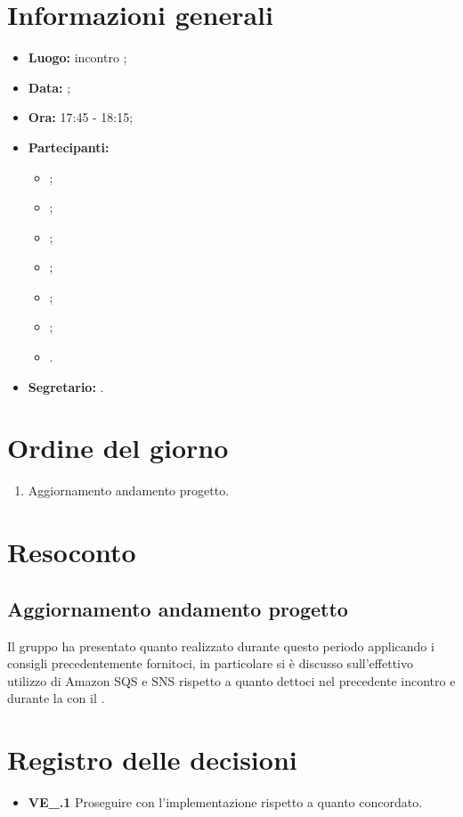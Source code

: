 \section{Informazioni generali}
\begin{itemize}
\item \textbf{Luogo:} incontro ;
\item \textbf{Data:} \Data;
\item \textbf{Ora:} 17:45 - 18:15;
\item \textbf{Partecipanti:}
	\begin{itemize}
		\item \BL{}; 
		\item \FF{};
		\item \MM{};
		\item \PC{};
		\item \TG{};
		\item \TL{};
		\item \Proponente{}.
	\end{itemize}
\item \textbf{Segretario:} \MM{}.
\end{itemize}

\section{Ordine del giorno}
\begin{enumerate}
	\item Aggiornamento andamento progetto.
\end{enumerate}

\section{Resoconto}
\subsection{Aggiornamento andamento progetto}
Il gruppo ha presentato quanto realizzato durante questo periodo applicando i consigli precedentemente fornitoci, in particolare si è discusso sull'effettivo utilizzo di Amazon SQS e SNS rispetto a quanto dettoci nel precedente incontro e durante la  con il \CR.

\section{Registro delle decisioni}
\begin{itemize}
	\item \textbf{VE\_\Data.1} Proseguire con l'implementazione rispetto a quanto concordato.
\end{itemize}
